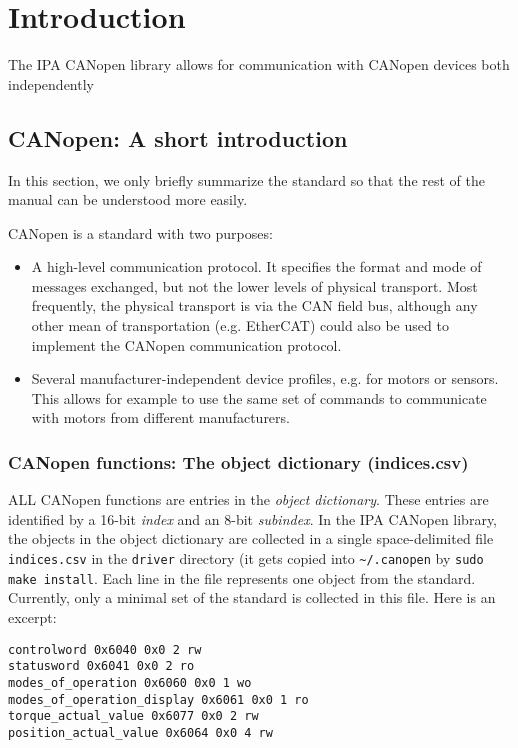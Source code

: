 \chapter{Introduction}
\label{chap:introduction}

The IPA CANopen library allows for communication with CANopen devices both independently 

\section{CANopen: A short introduction}

In this section, we only briefly summarize the standard so that the rest of the manual can be understood more easily.

CANopen is a standard with two purposes:
\begin{itemize}
\item A high-level communication protocol. It specifies the format and mode of messages exchanged, but not the lower levels of physical transport. Most frequently, the physical transport is via the CAN field bus, although any other mean of transportation (e.g. EtherCAT) could also be used to implement the CANopen communication protocol.
\item Several manufacturer-independent device profiles, e.g. for motors or sensors. This allows for example to use the same set of commands to communicate with motors from different manufacturers.
\end{itemize}

\subsection{CANopen functions: The object dictionary (indices.csv)}
\label{sec:objectdictionary}

ALL CANopen functions are entries in the {\em object dictionary}. These entries are identified by a 16-bit {\em index} and an 8-bit {\em subindex}. In the IPA CANopen library, the objects in the object dictionary are collected in a single space-delimited file \texttt{indices.csv} in the \texttt{driver} directory (it gets copied into \texttt{\textasciitilde/.canopen} by \texttt{sudo make install}. Each line in the file represents one object from the standard. Currently, only a minimal set of the standard is collected in this file. Here is an excerpt:

\begin{verbatim}
controlword 0x6040 0x0 2 rw
statusword 0x6041 0x0 2 ro
modes_of_operation 0x6060 0x0 1 wo
modes_of_operation_display 0x6061 0x0 1 ro
torque_actual_value 0x6077 0x0 2 rw
position_actual_value 0x6064 0x0 4 rw
\end{verbatim}

